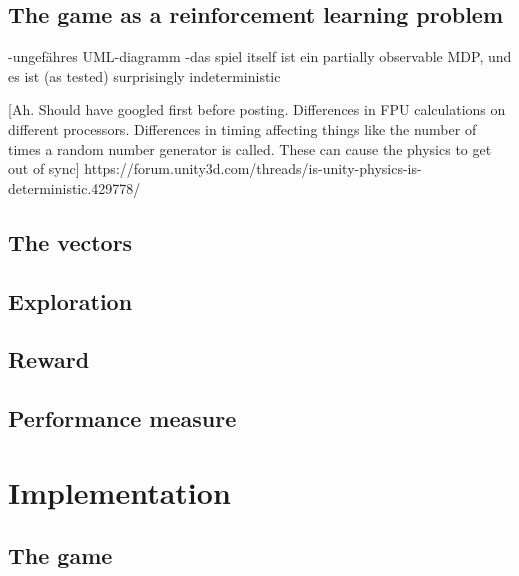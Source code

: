 
\subsection{The game as a reinforcement learning problem}

-ungefähres UML-diagramm
-das spiel itself ist ein partially observable MDP, und es ist (as tested) surprisingly indeterministic

[Ah. Should have googled first before posting. Differences in FPU calculations on different processors. Differences in timing affecting things like the number of times a random number generator is called. These can cause the physics to get out of sync]
https://forum.unity3d.com/threads/is-unity-physics-is-deterministic.429778/

\subsection{The vectors}

\subsection{Exploration}

\subsection{Reward}

\subsection{Performance measure}

\section{Implementation}

\subsection{The game}

